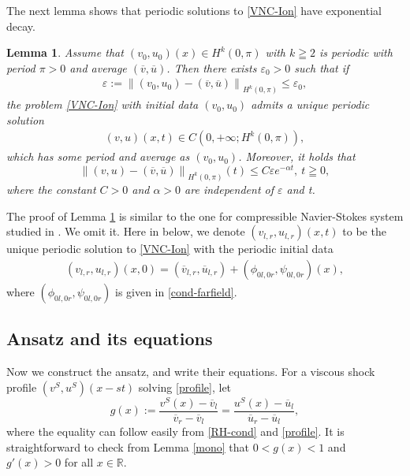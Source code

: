 \documentclass[12pt,reqno]{amsart}
\numberwithin{equation}{section}
\newcommand{\norm}[1]{\left\lVert #1 \right\rVert}
\def\R{\mathbb{R}}
\def\avl{\overline{v}_l}
\def\avr{\overline{v}_r}
\def\aul{\overline{u}_l}
\def\aur{\overline{u}_r}
\newtheorem{lemma}[theorem]{Lemma}
\begin{document}
The next lemma shows that periodic solutions to \eqref{VNC-Ion} have exponential decay. 
\begin{lemma}\label{decay}
	Assume that $(v_0,u_0)(x) \in H^k(0,\pi)$ with $k\geqq 2$ is periodic with period $\pi > 0$ and average $(\overline{v},\overline{u})$. Then there
	exists $\varepsilon_0>0$ such that if 
	\begin{align*}
		\varepsilon:=\norm{(v_0,u_0)-(\overline{v},\overline{u})}_{H^k(0,\pi)}\leq \varepsilon_0,
	\end{align*}
	the problem \eqref{VNC-Ion} with initial data $(v_0,u_0)$ admits a unique periodic solution
	\begin{align*}
		(v,u)(x,t)\in C(0,+\infty;H^k(0,\pi)),
	\end{align*}
	which has some period and average as $(v_0,u_0)$. Moreover, it holds that 
	\begin{equation}\label{decay1}
		\norm{(v,u)-(\overline{v},\overline{u})}_{H^k(0,\pi)}(t)\leq C\varepsilon e^{-\alpha t},~t\geqq 0,
	\end{equation}
	where the constant $C>0$ and $\alpha>0$ are independent of $\varepsilon$ and t.
\end{lemma}
The proof of Lemma \ref{decay} is similar to the one for compressible Navier-Stokes system studied in \cite{HuangYuanCMP}. We omit it. Here in below, we denote $(v_{l,r},u_{l,r})(x,t)$ to be the unique periodic solution to \eqref{VNC-Ion} with the periodic initial data 
\begin{align*}
	(v_{l,r},u_{l,r})(x,0)=(\overline{v}_{l,r},\overline{u}_{l,r})+(\phi_{0l,0r},\psi_{0l,0r})(x),
\end{align*}
where $(\phi_{0l,0r},\psi_{0l,0r})$ is given in \eqref{cond-farfield}. 

\subsection{Ansatz and its equations}

Now we construct the ansatz, and write their equations. For a viscous shock profile $(v^S,u^S)(x-st)$ solving \eqref{profile}, let
\begin{equation}\label{gfuntion}
	g(x):=\frac{v^S(x)-\avl}{\avr-\avl}=\frac{u^S(x)-\aul}{\aur-\aul},
\end{equation}
where the equality can follow easily from \eqref{RH-cond} and \ref{profile}. It is straightforward to check from Lemma \ref{mono} that
$0<g(x)<1$ and $g'(x)>0$ for all $x \in \R$.
\end{document}
